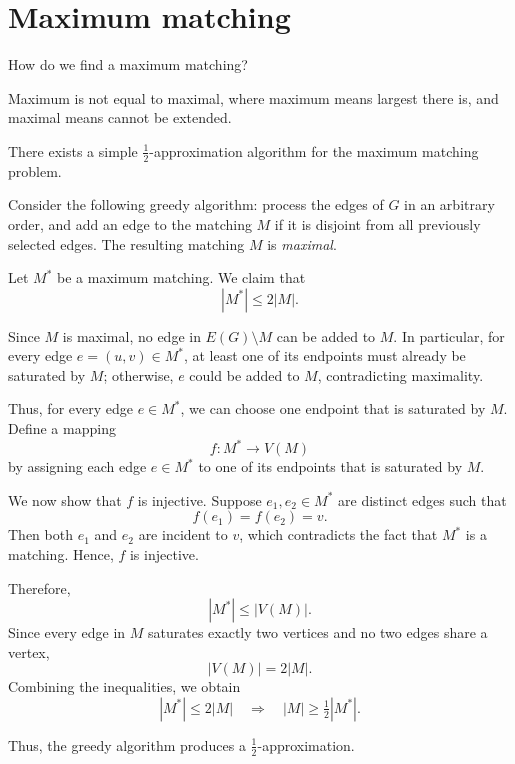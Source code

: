 \section{Maximum matching}
\begin{question}
    How do we find a maximum matching?
\end{question}

\begin{remark}
    Maximum is not equal to maximal, where maximum means largest there is, and maximal means cannot be extended.
\end{remark}

\begin{claim}
There exists a simple \( \tfrac{1}{2} \)-approximation algorithm for the maximum matching problem.
\end{claim}

\begin{explanation}
Consider the following greedy algorithm: process the edges of \( G \) in an arbitrary order, and add an edge to the matching \( M \) if it is disjoint from all previously selected edges. The resulting matching \( M \) is \emph{maximal}.

Let \( M^* \) be a maximum matching. We claim that
\[
|M^*| \le 2|M|.
\]

Since \( M \) is maximal, no edge in \( E(G) \setminus M \) can be added to \( M \). In particular, for every edge \( e = (u,v) \in M^* \), at least one of its endpoints must already be saturated by \( M \); otherwise, \( e \) could be added to \( M \), contradicting maximality.

Thus, for every edge \( e \in M^* \), we can choose one endpoint that is saturated by \( M \). Define a mapping
\[
f : M^* \to V(M)
\]
by assigning each edge \( e \in M^* \) to one of its endpoints that is saturated by \( M \).

We now show that \( f \) is injective. Suppose \( e_1, e_2 \in M^* \) are distinct edges such that
\[
f(e_1) = f(e_2) = v.
\]
Then both \( e_1 \) and \( e_2 \) are incident to \( v \), which contradicts the fact that \( M^* \) is a matching. Hence, \( f \) is injective.

Therefore,
\[
|M^*| \le |V(M)|.
\]
Since every edge in \( M \) saturates exactly two vertices and no two edges share a vertex,
\[
|V(M)| = 2|M|.
\]
Combining the inequalities, we obtain
\[
|M^*| \le 2|M| \quad \Longrightarrow \quad |M| \ge \tfrac{1}{2}|M^*|.
\]

Thus, the greedy algorithm produces a \( \tfrac{1}{2} \)-approximation.
\end{explanation}

